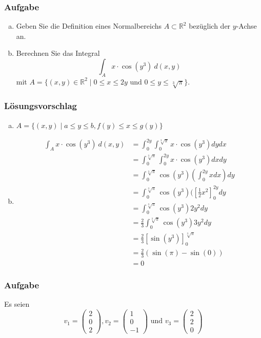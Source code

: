 \documentclass[a4paper,11pt]{scrartcl}
\newcounter{auf}
\newcommand{\Aufgabe}%
        {\addtocounter{auf}{1} \subsubsection*{\rmfamily  Aufgabe \theauf \hspace{1em}} }
\newcommand{\RR}{\mathbb{R}}
\begin{document}
\newpage
\Aufgabe


\begin{enumerate}[a)]
\item Geben Sie die Definition eines Normalbereichs $A\subset \RR^2$ bezüglich der $y$-Achse an.
\item Berechnen Sie das Integral
$$
\int_A x\cdot \cos(y^3)\ d(x,y)
$$
mit $A=\{(x,y) \in \RR^2 \mid 0\le x \le 2y \text { und } 0 \le y \le \sqrt[3]{\pi} \}$.
\end{enumerate}
%
%
\subsubsection*{Lösungsvorschlag}
\begin{enumerate}[a)]
\item $A=\{(x,y) \mid a\le y \le b, f(y) \le x \le g(y)\}$
\item 
\begin{align*}
\int_A x\cdot \cos(y^3)\ d(x,y)&=\int_0^{2y} \int_0^{\sqrt[3]{\pi}} x\cdot \cos(y^3) dydx\\
&=\int_0^{\sqrt[3]{\pi}} \int_0^{2y}x\cdot \cos(y^3) dxdy\\
&=\int_0^{\sqrt[3]{\pi}}\cos(y^3)( \int_0^{2y}x dx)dy\\
&=\int_0^{\sqrt[3]{\pi}}\cos(y^3)( [\frac{1}{2}x^2]_0^{2y} dy\\
&=\int_0^{\sqrt[3]{\pi}}\cos(y^3)2y^2dy\\
&=\frac{2}{3}\int_0^{\sqrt[3]{\pi}}\cos(y^3)3y^2dy\\
&=\frac{2}{3}[\sin(y^3)]_0^{\sqrt[3]{\pi}}\\
&=\frac{2}{3}(\sin(\pi)-\sin(0))\\
&=0
\end{align*}
\end{enumerate}
%
%

\newpage
\Aufgabe

Es seien 
$$
v_1=\begin{pmatrix}2\\0\\2 \end{pmatrix}, v_2=\begin{pmatrix}1\\0\\-1 \end{pmatrix} \text{ und }v_3=\begin{pmatrix}2\\2\\0 \end{pmatrix}
$$
\end{document}
